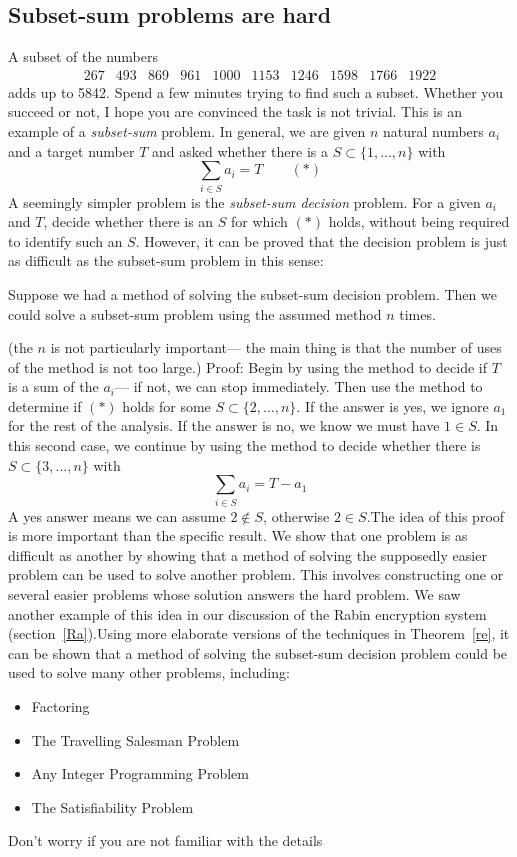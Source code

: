 \subsection{Subset-sum problems are hard}
A subset of the numbers $$\begin{array}{*{10}{r}}267&493&869&961&1000&1153&
1246&1598&1766&1922\end{array}$$ adds up to 5842. Spend a few minutes
trying to find such a subset.  Whether you succeed or not, I hope
you are convinced the task is not trivial.
\pq This is an example of a {\it subset-sum\/} problem.  In general,
we are given $n$ natural numbers $a_i$ and a target number $T$ and 
asked whether there is a $S\subset\{1,\dots,n\}$ with $$\sum_{i\in S}
a_i=T\qquad(*)$$A seemingly simpler problem is the {\it subset-sum decision\/}
problem.  For a given $a_i$ and $T$, decide whether there is an $S$
for which $(*)$ holds, without being required to identify such an $S$.
However, it can be proved that the decision problem is just as difficult
as the subset-sum problem in this sense:
\begin{Th} \label{re}
Suppose we had a method of solving the subset-sum decision
problem.  Then we could solve a subset-sum problem using the assumed
method $n$ times.\end{Th}(the $n$ is not particularly important--- the
main thing is that the number of uses of the method is not too large.)
\pq Proof: Begin by using the method to decide if
$T$ is a sum of the $a_i$--- if not, we can stop immediately.  Then
use the method to determine if $(*)$ holds for some $S\subset\{2,\dots,n\}$.
If the answer is yes, we ignore $a_1$ for the rest of the analysis.  If
the answer is no, we know we must have $1\in S$.  In this second case,
we continue by using the method to decide whether there is $S\subset\{3,\dots,
n\}$ with $$\sum_{i\in S}a_i=T-a_1$$A yes answer means we can assume $2\notin
S$, otherwise $2\in S$.\pq The idea of this proof is more important than
the specific result.  We show that one problem is as difficult as another
by showing that a method of solving the supposedly easier problem can be
used to solve another problem.  This involves constructing one or several
easier problems whose solution answers the hard problem.  We saw another
example of this idea in our discussion of the Rabin encryption system
(section~\ref{Ra}).\pq Using more elaborate versions of the techniques in
Theorem~\ref{re}, it can be shown that a method of solving
the subset-sum decision problem could be used to solve many other problems,
including:\begin{itemize}\item Factoring\item The Travelling Salesman
Problem\item Any Integer Programming Problem\item The Satisfiability
Problem\end{itemize}Don't worry if you are not familiar with the details
